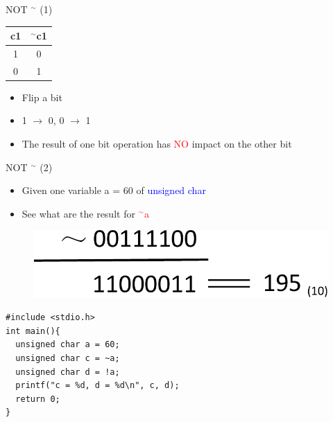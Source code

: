 \begin{frame}[fragile]{NOT $^\sim$ (1)}
\begin{table}
\begin{center}
\begin{tabular}{|c|c|}
\hline
c1 & $^\sim$c1 \\ \hline
1 & 0  \\ \hline
0 & 1  \\ \hline
\end{tabular}
\end{center}
\end{table}
\begin{itemize}
	\item {Flip a bit}
	\item {1 $\rightarrow$ 0, 0 $\rightarrow$ 1}
	\item {The result of one bit operation has \textcolor{red}{NO} impact on the other bit}
\end{itemize}
\end{frame}

\begin{frame}[fragile]{NOT $^\sim$ (2)}
\begin{itemize}
	\item {Given one variable a = 60 of \textcolor{blue}{unsigned char}}
	\item {See what are the result for \textcolor{red}{$^\sim$a}}
\end{itemize}
\begin{figure}
\begin{center}
	\includegraphics[width=0.4\linewidth]{figs/not.pdf}
\end{center}
\end{figure}
\vspace{0.15in}
\begin{center}
\begin{lstlisting}[linewidth=0.7\linewidth]
#include <stdio.h>
int main(){
  unsigned char a = 60;
  unsigned char c = ~a;
  unsigned char d = !a;  
  printf("c = %d, d = %d\n", c, d);
  return 0;
}
\end{lstlisting}
\end{center}
\end{frame}


